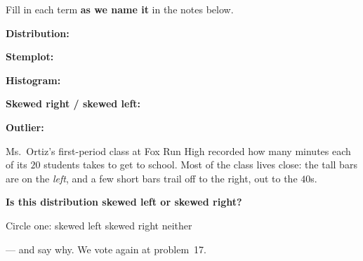 \documentclass[12pt]{article}
\newcommand{\termrowheight}{2.3cm}
\newlength{\termrowinset}\setlength{\termrowinset}{7pt}
\newcommand{\vterm}[1]{%
  \par\noindent\begin{minipage}[t][\termrowheight][t]{\linewidth}%
    \vspace*{\termrowinset}%
    \textbf{\textcolor{cerulean}{#1:}}%
  \end{minipage}\par}
\begin{document}

\vspace{0.15in}

\boxguard
\begin{vocabbox}
\small
Fill in each term \textbf{as we name it} in the notes below.
\vterm{Distribution}
\vterm{Stemplot}
\vterm{Histogram}
\vterm{Skewed right / skewed left}
\vterm{Outlier}
\end{vocabbox}

\boxguard[14]
\begin{hookbox}
\small
\begin{minipage}[t]{0.56\linewidth}\vspace{0pt}
Ms.~Ortiz's first-period class at Fox Run High recorded how many minutes each of its $20$
students takes to get to school. Most of the class lives close: the tall bars are on the
\emph{left}, and a few short bars trail off to the right, out to the $40$s.

\vspace{4pt}
\textbf{Is this distribution skewed left or skewed right?}\par
Circle one: \quad skewed left \qquad skewed right \qquad neither\par
--- and say why. We vote again at problem~17.
\end{minipage}\hfill
\begin{minipage}[t]{0.40\linewidth}\vspace{0pt}\centering
{}
\end{minipage}
\par{}
\end{hookbox}
\end{document}
